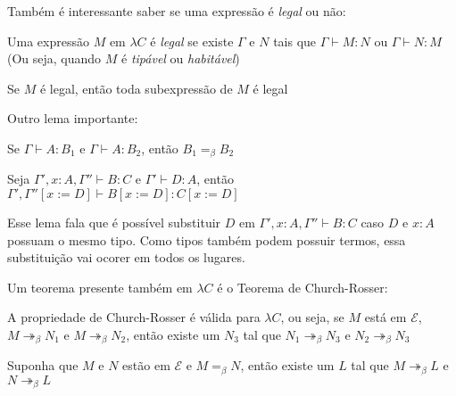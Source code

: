 \documentclass[../main.tex]{subfiles}
\begin{document}
Também é interessante saber se uma expressão é \emph{legal} ou não:

\begin{definition}
    Uma expressão $M$ em $\lambda C$ é \emph{legal} se existe $\Gamma$ e $N$ tais que $\Gamma \vdash M : N$ ou $\Gamma \vdash N : M$ (Ou seja, quando $M$ é \emph{tipável} ou \emph{habitável})
\end{definition}

\begin{lemma}
    Se $M$ é legal, então toda subexpressão de $M$ é legal
\end{lemma}

Outro lema importante:

\begin{lemma}
    Se $\Gamma \vdash A : B_1$ e $\Gamma \vdash A : B_2$, então $B_1 =_{\beta} B_2$
\end{lemma}

\begin{lemma}
    Seja $\Gamma ', x : A, \Gamma '' \vdash B : C$ e $\Gamma ' \vdash D : A$, então $\Gamma ', \Gamma '' [x := D] \vdash B[x := D] : C [x := D]$
\end{lemma}

Esse lema fala que é possível substituir $D$ em $\Gamma ', x : A, \Gamma '' \vdash B : C$ caso $D$ e $x : A$ possuam o mesmo tipo. Como tipos também podem possuir termos, essa substituição vai ocorer em todos os lugares.

Um teorema presente também em $\lambda C$ é o Teorema de Church-Rosser:

\begin{theorem}
    A propriedade de Church-Rosser é válida para $\lambda C$, ou seja, se $M$ está em $\mathcal{E}$, $M \twoheadrightarrow_{\beta} N_1$ e $M \twoheadrightarrow_{\beta} N_2$, então existe um $N_3$ tal que $N_1 \twoheadrightarrow_{\beta} N_3$ e $N_2 \twoheadrightarrow_{\beta} N_3$
\end{theorem}

\begin{corollary}
    Suponha que $M$ e $N$ estão em $\mathcal{E}$ e $M =_{\beta} N$, então existe um $L$ tal que $M \twoheadrightarrow_{\beta} L$ e $N \twoheadrightarrow_{\beta} L$
\end{corollary}
\end{document}
